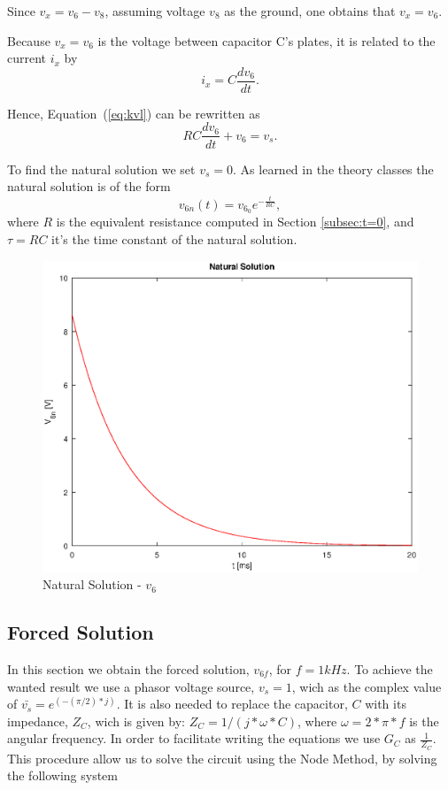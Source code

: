 Since $v_{x}=v_{6}-v_{8}$, assuming voltage $v_8$ as the ground, one obtains that $v_{x}=v_{6}$.

Because $v_{x}=v_{6}$ is the voltage between capacitor C's plates, it is related to the
current $i_x$ by
\begin{equation}
  i_{x} = C\frac{dv_6}{dt}.
\end{equation}

Hence, Equation~(\ref{eq:kvl}) can be rewritten as
\begin{equation}
  RC\frac{dv_6}{dt} + v_6 = v_s.
  \label{eq:kvl2}
\end{equation}

To find the natural solution we set $v_{s}=0$.
As learned in the theory classes the natural solution is of the form
\begin{equation}
  v_{6n}(t) = v_{6_0}e^{-\frac{t}{RC}},
  \label{eq:vo_nat}
\end{equation}
where $R$ is the equivalent resistance computed in Section \ref{subsec:t=0}, and $\tau=RC$ it's the time constant of the natural solution. 


\begin{figure}[H] \centering
  \includegraphics[width=0.8\linewidth]{nat_sol.eps}
  \caption{Natural Solution - $v_6$}
  \label{fig:natural solution}
\end{figure}


\newpage
\subsection{Forced Solution}
\label{subsec:forced_solution}

In this section we obtain the forced solution, $v_{6f}$, for $f=1kHz$.
To achieve the wanted result we use a phasor voltage source, $v_{s}=1$, wich as the complex value of $\bar{v_{s}}=e^{(-(\pi/2)*j)}$.
It is also needed to replace the capacitor, $C$ with its impedance, $Z_C$, wich is given by: $Z_{C}= 1/(j*\omega*C)$, where $\omega=2*\pi*f$ is the angular frequency.
In order to facilitate writing the equations we use $G_C$ as $\frac{1}{Z_C}$.
This procedure allow us to solve the circuit using the Node Method, by solving the following system

